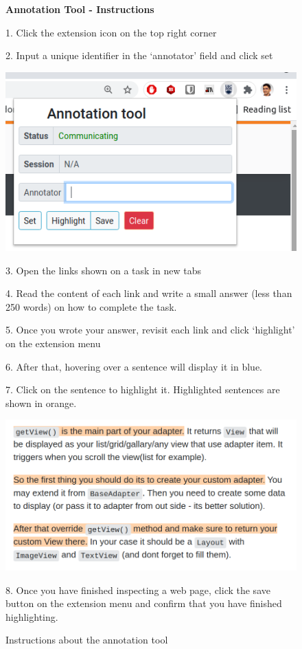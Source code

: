 

\begin{figure}
\begin{mdframed}[backgroundcolor=gray!05] 
\begin{scriptsize}

{\large \textbf{Annotation Tool - Instructions}} \bigskip


1. Click the extension icon on the top right corner \smallskip

2. Input a unique identifier in the `annotator' field and click set \smallskip


\begin{center}
    \includegraphics[width=.45\textwidth]{appendix/cp4/fig/annotation-tool.png} \smallskip
\end{center}

3. Open the links shown on a task in new tabs \smallskip

4. Read the content of each link and write a small answer (less than 250 words) on how to complete the task. \smallskip

5. Once you wrote your answer, revisit each link and click `highlight' on the extension menu \smallskip

6. After that, hovering over a sentence will display it in blue. \smallskip


7. Click on the sentence to highlight it. Highlighted sentences are shown in orange. \smallskip


\begin{center}
    \includegraphics[width=.65\textwidth]{appendix/cp4/fig/highlight-orange.png} \smallskip
\end{center}


8. Once you have finished inspecting a web page, click the save button on the extension menu and confirm that you have finished highlighting.

\end{scriptsize}
\end{mdframed}
\caption{Instructions about the annotation tool}
\end{figure}

